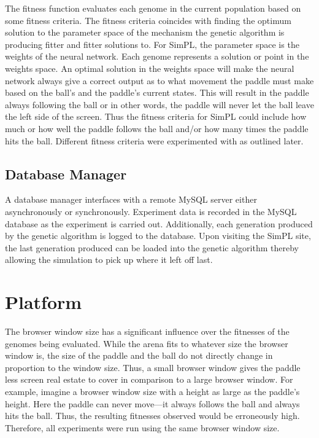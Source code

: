 \documentclass[a4paper,10pt]{article}
\begin{document}
The fitness function evaluates each genome in the current population based on some fitness criteria. The fitness criteria coincides with finding the optimum solution to the parameter space of the mechanism the genetic algorithm is producing fitter and fitter solutions to. For SimPL, the parameter space is the weights of the neural network. Each genome represents a solution or point in the weights space. An optimal solution in the weights space will make the neural network always give a correct output as to what movement the paddle must make based on the ball's and the paddle's current states. This will result in the paddle always following the ball or in other words, the paddle will never let the ball leave the left side of the screen. Thus the fitness criteria for SimPL could include how much or how well the paddle follows the ball and/or how many times the paddle hits the ball. Different fitness criteria were experimented with as outlined later. 


\subsection{Database Manager}

A database manager interfaces with a remote MySQL server either asynchronously or synchronously. Experiment data is recorded in the MySQL database as the experiment is carried out. Additionally, each generation produced by the genetic algorithm is logged to the database. Upon visiting the SimPL site, the last generation produced can be loaded into the genetic algorithm thereby allowing the simulation to pick up where it left off last.  

\section{Platform}

The browser window size has a significant influence over the fitnesses of the genomes being evaluated. While the arena fits to whatever size the browser window is, the size of the paddle and the ball do not directly change in proportion to the window size. Thus, a small browser window gives the paddle less screen real estate to cover in comparison to a large browser window. For example, imagine a browser window size with a height as large as the paddle's height. Here the paddle can never move---it always follows the ball and always hits the ball. Thus, the resulting fitnesses observed would be erroneously high. Therefore, all experiments were run using the same browser window size. 
\end{document}
